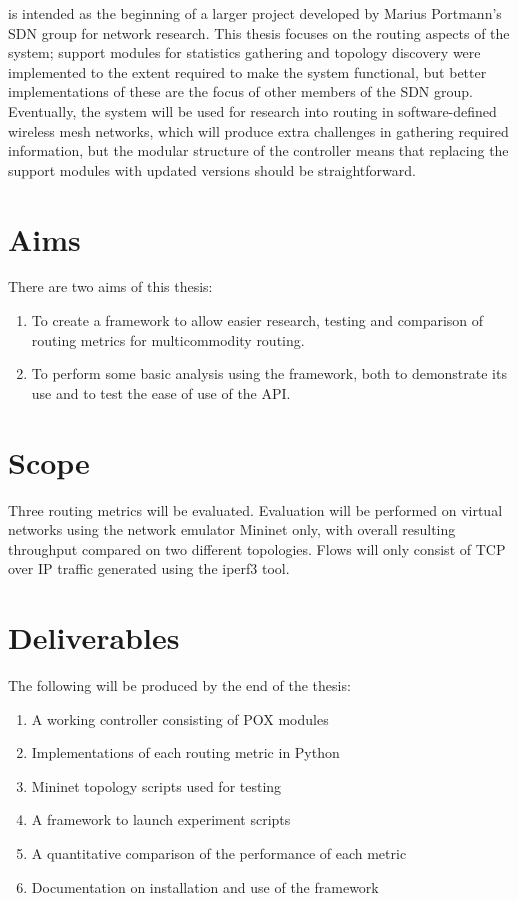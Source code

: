 \thesis{} is intended as the beginning of a larger project developed by Marius Portmann's SDN group for network research. This thesis focuses on the routing aspects of the system; support modules for statistics gathering and topology discovery were implemented to the extent required to make the system functional, but better implementations of these are the focus of other members of the SDN group. Eventually, the system will be used for research into routing in software-defined wireless mesh networks, which will produce extra challenges in gathering required information, but the modular structure of the controller means that replacing the support modules with updated versions should be straightforward.

\section{Aims}

There are two aims of this thesis:

\begin{enumerate}
  \item To create a framework to allow easier research, testing and comparison of routing metrics for multicommodity routing.
  \item To perform some basic analysis using the framework, both to demonstrate its use and to test the ease of use of the API.
\end{enumerate}

\section{Scope}
Three routing metrics will be evaluated. Evaluation will be performed on virtual networks using the network emulator Mininet only, with overall resulting throughput compared on two different topologies. Flows will only consist of TCP over IP traffic generated using the iperf3 tool.

\section{Deliverables}
The following will be produced by the end of the thesis:

\begin{enumerate}
  \item A working controller consisting of POX modules
  \item Implementations of each routing metric in Python
  \item Mininet topology scripts used for testing
  \item A framework to launch experiment scripts
  \item A quantitative comparison of the performance of each metric
  \item Documentation on installation and use of the framework
\end{enumerate}
